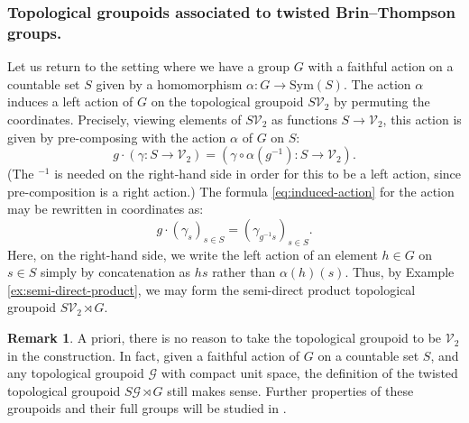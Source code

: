 \documentclass[10pt,a4paper]{amsart}
\numberwithin{equation}{section}
\numberwithin{figure}{section}
\theoremstyle{definition}
\newtheorem{rem}[thm]{Remark}
\newcommand{\cG}{\mathcal{G}}
\newcommand{\cV}{\mathcal{V}}
\begin{document}
\subsubsection*{Topological groupoids associated to twisted Brin--Thompson groups.}

Let us return to the setting where we have a group $G$ with a faithful action on a countable set $S$ given by a homomorphism $\alpha \colon G \to \mathrm{Sym}(S)$. The action $\alpha$ induces a left action of $G$ on the topological groupoid $S\cV_2$ by permuting the coordinates. Precisely, viewing elements of $S\cV_2$ as functions $S \to \cV_2$, this action is given by pre-composing with the action $\alpha$ of $G$ on $S$:
\begin{equation}
\label{eq:induced-action}
g \cdot (\gamma \colon S \to \cV_2) = (\gamma \circ \alpha(g^{-1}) \colon S \to \cV_2) .
\end{equation}
(The ${}^{-1}$ is needed on the right-hand side in order for this to be a left action, since pre-composition is a right action.) The formula \eqref{eq:induced-action} for the action may be rewritten in coordinates as:
\begin{equation}
\label{eq:induced-action-coordinates}
g \cdot (\gamma_s)_{s \in S} = (\gamma_{g^{-1}s})_{s \in S} .
\end{equation}
Here, on the right-hand side, we write the left action of an element $h \in G$ on $s \in S$ simply by concatenation as $hs$ rather than $\alpha(h)(s)$. Thus, by Example \ref{ex:semi-direct-product}, we may form the semi-direct product topological groupoid $S\mathcal{V}_2 \rtimes G$.

\begin{rem}
A priori, there is no reason to take the topological groupoid to be $\cV_2$ in the construction. In fact, given a faithful action of $G$ on a countable set $S$, and any topological groupoid $\cG$ with compact unit space, the definition of the twisted topological groupoid $S\cG\rtimes G$ still makes sense. Further properties of these groupoids and their full groups will be studied in \cite{WuZhao25+}.
\end{rem}
\end{document}
